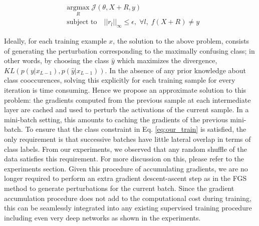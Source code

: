 \documentclass[letterpaper]{article} %
\begin{document}
\begin{equation}
\begin{aligned}
& \underset{R}{\text{argmax}} \; \mathcal{J}(\theta,X+R,y) \\
& \text{subject to} \quad ||r_{l}||_{\infty} \leq \epsilon, \; \forall l, \; f(X+R) \neq y
\label{eq:our_train}
\end{aligned}
\end{equation}

Ideally, for each training example $x$, the solution to the above problem, consists of generating the perturbation corresponding to the maximally confusing class; in other words, by choosing the class $\hat{y}$ which maximizes the divergence, $KL(p(y|x_{L-1}),p(\hat{y}|x_{L-1}))$.  In the absence of any prior knowledge about class cooccurences, solving this explicitly for each training sample for every iteration is time consuming. Hence we propose an approximate solution to this problem: the gradients computed from the previous sample at each intermediate layer are cached and used to perturb the activations of the current sample. In a mini-batch setting, this amounts to caching the gradients of the previous mini-batch. To ensure that the class constraint in Eq. \ref{eq:our_train} is satisfied, the only requirement is that successive batches have little lateral overlap in terms of class labels. From our experiments, we observed that any random shuffle of the data satisfies this requirement. For more discussion on this, please refer to the experiments section. Given this procedure of accumulating gradients, we are no longer required to perform an extra gradient descent-ascent step as in the FGS method to generate perturbations for the current batch. Since the gradient accumulation procedure does not add to the computational cost during training, this can be seamlessly integrated into any existing supervised training procedure including even very deep networks as shown in the experiments.
\end{document}
